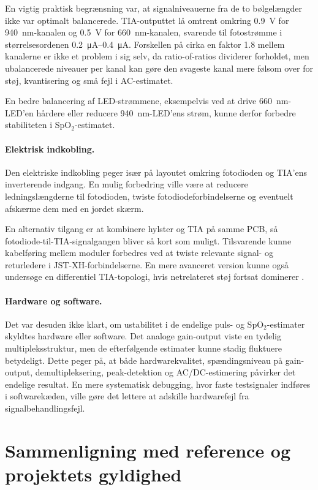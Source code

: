 En vigtig praktisk begrænsning var, at signalniveauerne fra de to bølgelængder ikke var optimalt balancerede. TIA-outputtet lå omtrent omkring \SI{0.9}{V} for \SI{940}{nm}-kanalen og \SI{0.5}{V} for \SI{660}{nm}-kanalen, svarende til fotostrømme i størrelsesordenen \SIrange{0.2}{0.4}{\micro\ampere}. Forskellen på cirka en faktor \num{1.8} mellem kanalerne er ikke  et problem i sig selv, da ratio-of-ratios dividerer forholdet, men ubalancerede niveauer per kanal kan gøre den svageste kanal mere følsom over for støj, kvantisering og små fejl i AC-estimatet.

En bedre balancering af LED-strømmene, eksempelvis ved at drive \SI{660}{nm}-LED'en hårdere eller reducere \SI{940}{nm}-LED'ens strøm, kunne derfor forbedre stabiliteten i SpO$_2$-estimatet.

\paragraph{Elektrisk indkobling.}
Den elektriske indkobling peger især på layoutet omkring fotodioden og TIA'ens inverterende indgang. En mulig forbedring ville være at reducere ledningslængderne til fotodioden, twiste fotodiodeforbindelserne og eventuelt afskærme dem med en jordet skærm.

En alternativ tilgang er at kombinere hylster og TIA på samme PCB, så fotodiode-til-TIA-signalgangen bliver så kort som muligt. Tilsvarende kunne kabelføring mellem moduler forbedres ved at twiste relevante signal- og returledere i JST-XH-forbindelserne. En mere avanceret version kunne også undersøge en differentiel TIA-topologi, hvis netrelateret støj fortsat dominerer \cite[s.~82--83]{Webster1997}.

\paragraph{Hardware og software.}
Det var desuden ikke klart, om ustabilitet i de endelige puls- og SpO$_2$-estimater skyldtes hardware eller software. Det analoge gain-output viste en tydelig multipleksstruktur, men de efterfølgende estimater kunne stadig fluktuere betydeligt. Dette peger på, at både hardwarekvalitet, spændingsniveau på gain-output, demultipleksering, peak-detektion og AC/DC-estimering påvirker det endelige resultat. En mere systematisk debugging, hvor faste testsignaler indføres i softwarekæden, ville gøre det lettere at adskille hardwarefejl fra signalbehandlingsfejl.

\section{Sammenligning med reference og projektets gyldighed}
